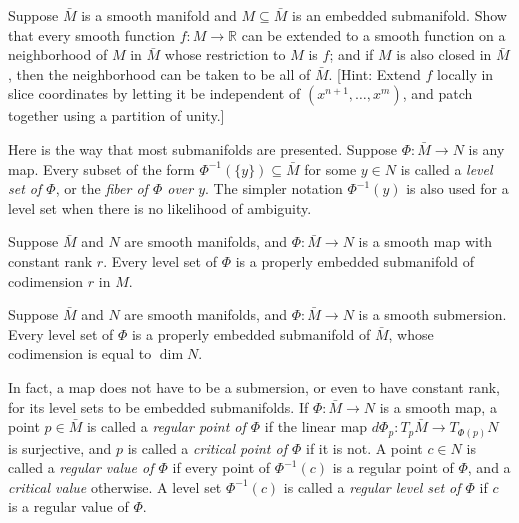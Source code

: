 \begin{exercise}
\label{exer:extension-smooth-function}
Suppose $\bar{M}$ is a smooth manifold and $M \subseteq \bar{M}$ is an embedded submanifold. Show that every smooth function $f : M \to \mathbb{R}$ can be extended to a smooth function on a neighborhood of $M$ in $\bar{M}$ whose restriction to $M$ is $f$; and if $M$ is also closed in $\bar{M}$, then the neighborhood can be taken to be all of $\bar{M}$. [Hint: Extend $f$ locally in slice coordinates by letting it be independent of $(x^{n+1},\ldots,x^m)$, and patch together using a partition of unity.]
\end{exercise}


Here is the way that most submanifolds are presented. Suppose $\Phi: \bar{M} \to N$ is any map. Every subset of the form $\Phi^{-1}(\{y\}) \subseteq \bar{M}$ for some $y \in N$ is called a \emph{level set of $\Phi$}, or the \emph{fiber of $\Phi$ over $y$}. The simpler notation $\Phi^{-1}(y)$ is also used for a level set when there is no likelihood of ambiguity.

\begin{theorem}
\label{thm:constant-rank-level-set}
Suppose $\bar{M}$ and $N$ are smooth manifolds, and $\Phi: \bar{M} \to N$ is a smooth map with constant rank $r$. Every level set of $\Phi$ is a properly embedded submanifold of codimension $r$ in $M$.
\end{theorem}

\begin{corollary}
\label{cor:submersion-level-set}
Suppose $\bar{M}$ and $N$ are smooth manifolds, and $\Phi: \bar{M} \to N$ is a smooth submersion. Every level set of $\Phi$ is a properly embedded submanifold of $\bar{M}$, whose codimension is equal to $\dim N$.
\end{corollary}

In fact, a map does not have to be a submersion, or even to have constant rank, for its level sets to be embedded submanifolds. If $\Phi: \bar{M} \to N$ is a smooth map, a point $p \in \bar{M}$ is called a \emph{regular point of $\Phi$} if the linear map $d\Phi_p: T_p \bar{M} \to T_{\Phi(p)} N$ is surjective, and $p$ is called a \emph{critical point of $\Phi$} if it is not. A point $c \in N$ is called a \emph{regular value of $\Phi$} if every point of $\Phi^{-1}(c)$ is a regular point of $\Phi$, and a \emph{critical value} otherwise. A level set $\Phi^{-1}(c)$ is called a \emph{regular level set of $\Phi$} if $c$ is a regular value of $\Phi$.

